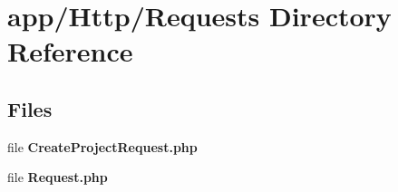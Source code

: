 \section{app/\+Http/\+Requests Directory Reference}
\label{dir_928c9b13d58efab2ce6266ed0e67d20d}
\subsection*{Files}
\begin{DoxyCompactItemize}
\item 
file {\bf Create\+Project\+Request.\+php}
\item 
file {\bf Request.\+php}
\end{DoxyCompactItemize}
